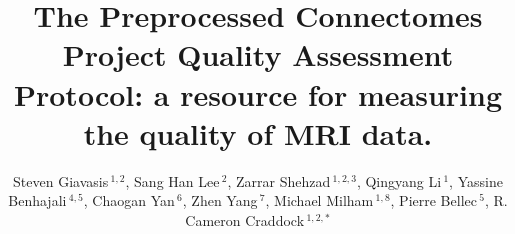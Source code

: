 \documentclass{frontiersSCNS} %
\def\firstAuthorLast{Giavasis {et~al.}} %
\def\Authors{Steven Giavasis\,$^{1,2}$,
        Sang Han Lee\,$^{2}$,
        Zarrar Shehzad\,$^{1,2,3}$,
        Qingyang Li\,$^{1}$,
        Yassine Benhajali\,$^{4,5}$,
        Chaogan Yan\,$^{6}$,
        Zhen Yang\,$^{7}$,
        Michael Milham\,$^{1,8}$,
        Pierre Bellec\,$^{5}$,
        R. Cameron Craddock\,$^{1,2,*}$
}
\begin{document}
\onecolumn
{}

\title[Running Title]{The Preprocessed Connectomes Project Quality Assessment Protocol: a resource for measuring the quality of MRI data.} 

\author[\firstAuthorLast ]{\Authors} %
\address{} %
\correspondance{} %

\extraAuth{}%


\maketitle

\end{document}
